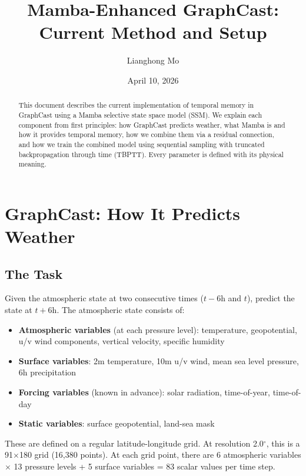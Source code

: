 \documentclass[11pt,a4paper]{article}
\title{Mamba-Enhanced GraphCast: Current Method and Setup}
\author{Lianghong Mo}
\date{April 10, 2026}
\begin{document}
\maketitle

\begin{abstract}
This document describes the current implementation of temporal memory in GraphCast using a Mamba selective state space model (SSM). We explain each component from first principles: how GraphCast predicts weather, what Mamba is and how it provides temporal memory, how we combine them via a residual connection, and how we train the combined model using sequential sampling with truncated backpropagation through time (TBPTT). Every parameter is defined with its physical meaning.
\end{abstract}

\tableofcontents
\newpage

\section{GraphCast: How It Predicts Weather}

\subsection{The Task}

Given the atmospheric state at two consecutive times ($t{-}6\text{h}$ and $t$), predict the state at $t{+}6\text{h}$. The atmospheric state consists of:

\begin{itemize}[nosep]
  \item \textbf{Atmospheric variables} (at each pressure level): temperature, geopotential, u/v wind components, vertical velocity, specific humidity
  \item \textbf{Surface variables}: 2m temperature, 10m u/v wind, mean sea level pressure, 6h precipitation
  \item \textbf{Forcing variables} (known in advance): solar radiation, time-of-year, time-of-day
  \item \textbf{Static variables}: surface geopotential, land-sea mask
\end{itemize}

These are defined on a regular latitude-longitude grid. At resolution 2.0$^\circ$, this is a 91$\times$180 grid (16,380 points). At each grid point, there are 6 atmospheric variables $\times$ 13 pressure levels + 5 surface variables = 83 scalar values per time step.
\end{document}
